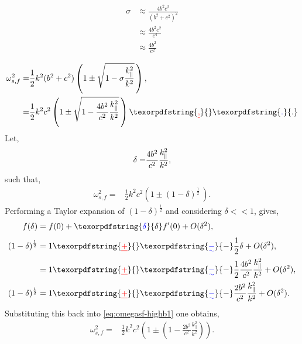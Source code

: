 \documentclass[a4paper,12pt,fourier,authoryear,custommargin]{Classes/PhDThesisPSnPDF}
\providecommand{\DIFaddtex}[1]{{\protect\color{blue}\uwave{#1}}} %
\providecommand{\DIFdeltex}[1]{{\protect\color{red}\sout{#1}}}                      %
\providecommand{\DIFaddbegin}{} %
\providecommand{\DIFaddend}{} %
\providecommand{\DIFdelbegin}{} %
\providecommand{\DIFdelend}{} %
\providecommand{\DIFadd}[1]{\texorpdfstring{\DIFaddtex{#1}}{#1}} %
\providecommand{\DIFdel}[1]{\texorpdfstring{\DIFdeltex{#1}}{}} %
\begin{document}
\begin{align}
    \sigma &\approx \frac{4b^2c^2}{(b^2+c^2)^2}\\
           &\approx \frac{4b^2c^2}{c^4}\\
           &\approx \frac{4b^2}{c^2}
\end{align}

\begin{align}
    \omega^2_{s,f} =& \frac{1}{2}k^2(b^2+c^2)\left(1 \pm \sqrt{1 - \sigma \frac{k^2_\parallel}{k^2}}\,\right),\\
                   =& \frac{1}{2}k^2c^2\left(1 \pm \sqrt{1 - \frac{4b^2}{c^2} \frac{k^2_\parallel}{k^2}}\,\right)\DIFdelbegin \DIFdel{,}\DIFdelend \DIFaddbegin \DIFadd{.}\DIFaddend \\
\end{align}
Let,
\begin{align}
    \delta =& \frac{4b^2}{c^2} \frac{k^2_\parallel}{k^2},\notag\\
\end{align}
such that,
\begin{align}
    \omega^2_{s,f} =& \frac{1}{2}k^2c^2\left(1 \pm (1 - \delta)^{\frac{1}{2}}\,\right).\label{eq:omegasf-highb1}
\end{align}
Performing a Taylor expansion of $(1-\delta)^{\frac{1}{2}}$ and considering $\delta << 1$, gives,
\begin{align}
    f(\delta) &= f(0) + \DIFaddbegin \DIFadd{\delta }\DIFaddend f^\prime(0) + O(\delta^2),\notag\\
    (1-\delta)^{\frac{1}{2}} &= 1 \DIFdelbegin \DIFdel{+ }\DIFdelend \DIFaddbegin \DIFadd{- }\DIFaddend \frac{1}{2}\delta + O(\delta^2),\\
                             &= 1 \DIFdelbegin \DIFdel{+ }\DIFdelend \DIFaddbegin \DIFadd{- }\DIFaddend \frac{1}{2}\frac{4b^2}{c^2} \frac{k^2_\parallel}{k^2} + O(\delta^2),\\
    (1-\delta)^{\frac{1}{2}} &= 1 \DIFdelbegin \DIFdel{+ }\DIFdelend \DIFaddbegin \DIFadd{- }\DIFaddend \frac{2b^2}{c^2} \frac{k^2_\parallel}{k^2} + O(\delta^2).
\end{align}
Substituting this back into \cref{eq:omegasf-highb1} one obtains,
\begin{align}
    \omega^2_{s,f} =& \frac{1}{2}k^2c^2\left(1 \pm \left(1 - \frac{2b^2}{c^2} \frac{k^2_\parallel}{k^2}\right)\right).
\end{align}
\end{document}
